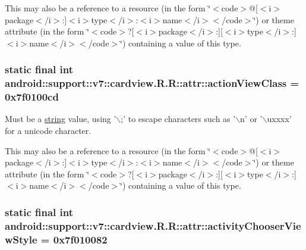 This may also be a reference to a resource (in the form \char`\"{}$<$code$>$@\mbox{[}$<$i$>$package$<$/i$>$:\mbox{]}$<$i$>$type$<$/i$>$:$<$i$>$name$<$/i$>$$<$/code$>$\char`\"{}) or theme attribute (in the form \char`\"{}$<$code$>$?\mbox{[}$<$i$>$package$<$/i$>$:\mbox{]}\mbox{[}$<$i$>$type$<$/i$>$:\mbox{]}$<$i$>$name$<$/i$>$$<$/code$>$\char`\"{}) containing a value of this type. \hypertarget{classandroid_1_1support_1_1v7_1_1cardview_1_1_r_1_1attr_0806f2277fae163a5ffccafa9a73fced}{
\subsubsection[{actionViewClass}]{\setlength{\rightskip}{0pt plus 5cm}static final int android::support::v7::cardview.R.R::attr::actionViewClass = 0x7f0100cd}}
\label{classandroid_1_1support_1_1v7_1_1cardview_1_1_r_1_1attr_0806f2277fae163a5ffccafa9a73fced}


Must be a \hyperlink{classandroid_1_1support_1_1v7_1_1cardview_1_1_r_1_1string}{string} value, using '$\backslash$;' to escape characters such as '$\backslash$n' or '$\backslash$uxxxx' for a unicode character. 

This may also be a reference to a resource (in the form \char`\"{}$<$code$>$@\mbox{[}$<$i$>$package$<$/i$>$:\mbox{]}$<$i$>$type$<$/i$>$:$<$i$>$name$<$/i$>$$<$/code$>$\char`\"{}) or theme attribute (in the form \char`\"{}$<$code$>$?\mbox{[}$<$i$>$package$<$/i$>$:\mbox{]}\mbox{[}$<$i$>$type$<$/i$>$:\mbox{]}$<$i$>$name$<$/i$>$$<$/code$>$\char`\"{}) containing a value of this type. \hypertarget{classandroid_1_1support_1_1v7_1_1cardview_1_1_r_1_1attr_61de835bb6fc4a605bbf0569d12a3e0a}{
\subsubsection[{activityChooserViewStyle}]{\setlength{\rightskip}{0pt plus 5cm}static final int android::support::v7::cardview.R.R::attr::activityChooserViewStyle = 0x7f010082}}
\label{classandroid_1_1support_1_1v7_1_1cardview_1_1_r_1_1attr_61de835bb6fc4a605bbf0569d12a3e0a}


